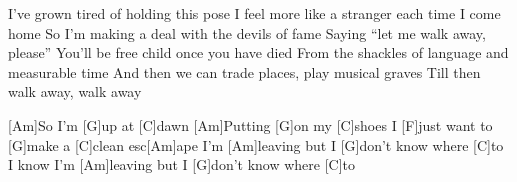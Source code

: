 \begin{guitar}
\begin{multicols}{2}
I’ve grown tired of holding this pose
I feel more like a stranger each time I come home
So I’m making a deal with the devils of fame
Saying “let me walk away, please”
You’ll be free child once you have died
From the shackles of language and measurable time
And then we can trade places, play musical graves
Till then walk away, walk away

[Am]So I’m [G]up at [C]dawn
[Am]Putting [G]on my [C]shoes
I [F]just want to [G]make a [C]clean esc[Am]ape
I’m [Am]leaving but I [G]don’t know where [C]to
I know I’m [Am]leaving but I [G]don’t know where [C]to 
\end{multicols}
\end{guitar}

